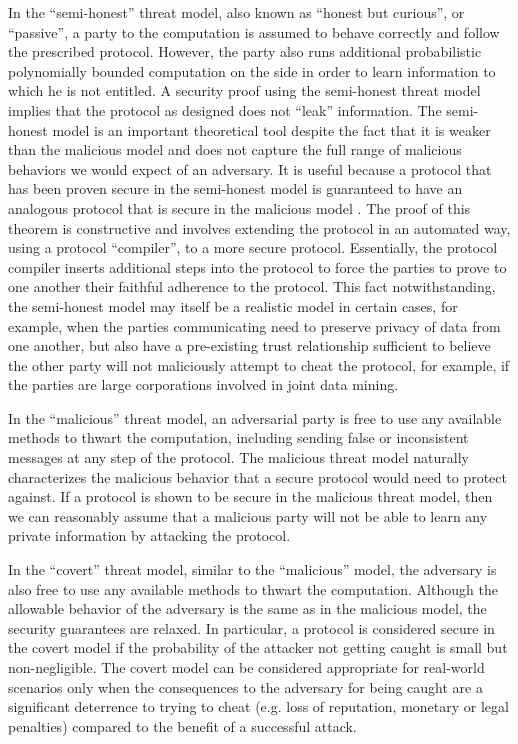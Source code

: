 In the {}``semi-honest'' threat model, also known as {}``honest
but curious'', or {}``passive'', \cite{GMW87} a party to the computation
is assumed to behave correctly and follow the prescribed protocol.
However, the party also runs additional probabilistic polynomially
bounded computation on the side in order to learn information to which
he is not entitled. A security proof using the semi-honest threat
model implies that the protocol as designed does not {}``leak''
information. The semi-honest model is an important theoretical tool
despite the fact that it is weaker than the malicious model and does
not capture the full range of malicious behaviors we would expect
of an adversary. It is useful because a protocol that has been proven
secure in the semi-honest model is guaranteed to have an analogous
protocol that is secure in the malicious model \cite{GMW87}. The
proof of this theorem is constructive and involves extending the protocol
in an automated way, using a protocol {}``compiler'', to a more
secure protocol. Essentially, the protocol compiler inserts additional
steps into the protocol to force the parties to prove to one another
their faithful adherence to the protocol. This fact notwithstanding,
the semi-honest model may itself be a realistic model in certain cases,
for example, when the parties communicating need to preserve privacy
of data from one another, but also have a pre-existing trust relationship
sufficient to believe the other party will not maliciously attempt
to cheat the protocol, for example, if the parties are large corporations
involved in joint data mining.

In the {}``malicious'' threat model, an adversarial party is free
to use any available methods to thwart the computation, including
sending false or inconsistent messages at any step of the protocol.
The malicious threat model naturally characterizes the malicious behavior
that a secure protocol would need to protect against. If a protocol
is shown to be secure in the malicious threat model, then we can reasonably
assume that a malicious party will not be able to learn
any private information by attacking the protocol.

In the {}``covert'' threat model, similar to the {}``malicious''
model, the adversary is also free to use any available methods to
thwart the computation. Although the allowable behavior of the adversary
is the same as in the malicious model, the security guarantees are relaxed.
In particular, a protocol is considered secure in the covert model
if the probability of the attacker not getting caught is small but
non-negligible. The covert model can be considered appropriate for
real-world scenarios only when the consequences to the adversary for
being caught are a significant deterrence to trying to cheat (e.g. 
loss of reputation, monetary or legal penalties) compared to
the benefit of a successful attack. \cite{aumannlindell}


